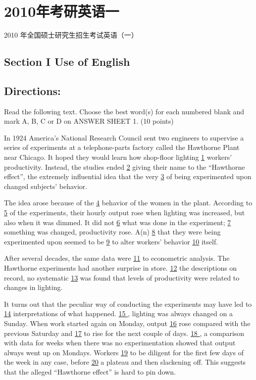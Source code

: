 \documentclass[UTF8,11pt]{ctexart}
\begin{document}
\section*{2010年考研英语一}
2010 年全国硕士研究生招生考试英语（一）


\subsection*{\textbf{Section I Use of English}}


\subsection*{\textbf{Directions:}}


Read the following text. Choose the best word(s) for each numbered blank and mark A, B, C or D on ANSWER SHEET 1. (10 points)


In 1924 America’s National Research Council sent two engineers to supervise a series of experiments at a telephone-parts factory called the Hawthorne Plant near Chicago. It hoped they would learn how shop-floor lighting \uline{1} workers’ productivity. Instead, the studies ended \uline{2} giving their name to the “Hawthorne effect”, the extremely influential idea that the very \uline{3} of being experimented upon changed subjects’ behavior.


The idea arose because of the \uline{4} behavior of the women in the plant. According to \uline{5} of the experiments, their hourly output rose when lighting was increased, but also when it was dimmed. It did not \uline{6} what was done in the experiment; \uline{7} something was changed, productivity rose. A(n) \uline{8} that they were being experimented upon seemed to be \uline{9} to alter workers’ behavior \uline{10} itself.


After several decades, the same data were \uline{11} to econometric analysis. The Hawthorne experiments had another surprise in store. \uline{12} the descriptions on record, no systematic \uline{13} was found that levels of productivity were related to changes in lighting.


It turns out that the peculiar way of conducting the experiments may have led to \uline{14} interpretations of what happened. \uline{15 }, lighting was always changed on a Sunday. When work started again on Monday, output \uline{16} rose compared with the previous Saturday and \uline{17} to rise for the next couple of days. \uline{18 }, a comparison with data for weeks when there was no experimentation showed that output always went up on Mondays. Workers \uline{19} to be diligent for the first few days of the week in any case, before \uline{20} a plateau and then slackening off. This suggests that the alleged “Hawthorne effect” is hard to pin down.
\end{document}
